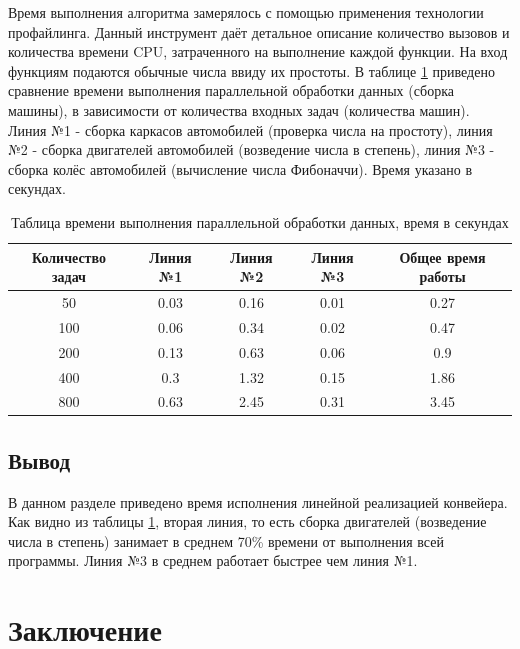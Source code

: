\documentclass[12pt]{report}
\begin{document}
Время выполнения алгоритма замерялось с помощью применения технологии профайлинга. Данный инструмент даёт детальное описание количество вызовов и количества времени CPU, затраченного на выполнение каждой функции. На вход функциям подаются обычные числа ввиду их простоты.
В таблице \ref{tab01} приведено сравнение времени выполнения параллельной обработки данных (сборка машины), в зависимости от количества входных задач (количества машин). Линия №1 - сборка каркасов автомобилей (проверка числа на простоту), линия №2 - сборка двигателей автомобилей (возведение числа в степень), линия №3 - сборка колёс автомобилей (вычисление числа Фибоначчи). Время указано в секундах.

\begin{table} [h!]
	\caption{Таблица времени выполнения параллельной обработки данных, время в секундах}
	\label{tab01}
	\begin{center}
		\begin{tabular}{|c c c c c|} 
		 	\hline
			Количество задач & Линия №1 & Линия №2 & Линия №3 & Общее время работы  \\  
		 	\hline
		 	50 & 0.03 & 0.16 & 0.01 & 0.27 \\
		 	\hline
		 	100 & 0.06 & 0.34 & 0.02 & 0.47 \\
		 	\hline
		 	200 & 0.13 & 0.63 & 0.06 & 0.9 \\
		 	\hline
			400 & 0.3 & 1.32 & 0.15 & 1.86 \\
			\hline
			800 & 0.63  & 2.45 & 0.31 & 3.45 \\
			\hline
		\end{tabular}
	\end{center}
\end{table}

\section*{Вывод}

В данном разделе приведено время исполнения линейной реализацией конвейера. Как видно из таблицы \ref{tab01}, вторая линия, то есть сборка двигателей (возведение числа в степень) занимает в среднем 70\% времени от выполнения всей программы. Линия №3 в среднем работает быстрее чем линия №1.

\chapter*{Заключение}
\end{document}
